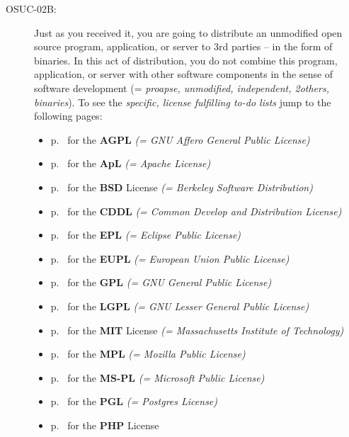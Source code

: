 \begin{description}
\item[OSUC-02B:]\label{OSUC-02B-DEF} Just as you received it, you are going to
distribute an unmodified open source program, application, or server to 3rd
parties -- in the form of binaries. In this act of distribution, you do not
combine this program, application, or server with other software components in
the sense of software development (= \textit{proapse, unmodified, independent,
2others, binaries}). To see the \textit{specific, license fulfilling to-do
lists} jump to the following pages:
   \begin{itemize}
    \item p.\ \pageref{OSUC-02B-AGPL} for the \textbf{AGPL}
      \textit{(= GNU Affero General Public License)} 
    \item p.\ \pageref{OSUC-02B-Apache20} for the \textbf{ApL}
      \textit{(= Apache License)}
    \item p.\ \pageref{OSUC-02B-BSD} for the \textbf{BSD} License
      \textit{(= Berkeley Software Distribution)}
    \item p.\ \pageref{OSUC-02B-CDDL} for the \textbf{CDDL}
      \textit{(= Common Develop and Distribution License)}  
    \item p.\ \pageref{OSUC-02B-EPL} for the \textbf{EPL}
      \textit{(= Eclipse Public License)}     
    \item p.\ \pageref{OSUC-02B-EUPL} for the \textbf{EUPL}
      \textit{(= European Union Public License)} 
    \item p.\ \pageref{OSUC-02B-GPL} for the \textbf{GPL}
       \textit{(= GNU General Public License)} 
    \item p.\ \pageref{OSUC-02B-LGPL} for the \textbf{LGPL}
      \textit{(= GNU Lesser General Public License)}           
    \item p.\ \pageref{OSUC-02B-MIT} for the \textbf{MIT} License
       \textit{(= Massachusetts Institute of Technology)} 
    \item p.\ \pageref{OSUC-02B-MPL} for the \textbf{MPL}
      \textit{(= Mozilla Public License)}     
    \item p.\ \pageref{OSUC-02B-MS-PL} for the \textbf{MS-PL}
      \textit{(= Microsoft Public License)} 
    \item p.\ \pageref{OSUC-02B-PGL} for the \textbf{PGL}
      \textit{(= Postgres License)} 
    \item p.\ \pageref{OSUC-02B-PHP} for the \textbf{PHP} License 
  \end{itemize}
  

\end{description}
